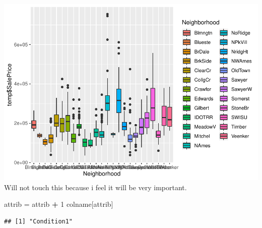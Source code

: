\documentclass[]{article}
\newenvironment{Shaded}{\begin{snugshade}}{\end{snugshade}}
\newcommand{\DecValTok}[1]{\textcolor[rgb]{0.00,0.00,0.81}{#1}}
\newcommand{\StringTok}[1]{\textcolor[rgb]{0.31,0.60,0.02}{#1}}
\newcommand{\OperatorTok}[1]{\textcolor[rgb]{0.81,0.36,0.00}{\textbf{#1}}}
\newcommand{\NormalTok}[1]{#1}
\begin{document}
\includegraphics{EDA_files/figure-latex/unnamed-chunk-35-1.pdf} Will not
touch this because i feel it will be very important.

\begin{Shaded}
\begin{Highlighting}[]
\NormalTok{attrib =}\StringTok{ }\NormalTok{attrib }\OperatorTok{+}\StringTok{ }\DecValTok{1}
\NormalTok{colname[attrib]}
\end{Highlighting}
\end{Shaded}

\begin{verbatim}
## [1] "Condition1"
\end{verbatim}
\end{document}
